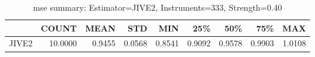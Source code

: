 \begin{table}[ht]
\centering
\caption{mse summary: Estimator=JIVE2, Instruments=333, Strength=0.40}
\begin{tabular}{lrrrrrrrr}
\toprule
 & COUNT & MEAN & STD & MIN & 25\% & 50\% & 75\% & MAX \\
\midrule
JIVE2 & 10.0000 & 0.9455 & 0.0568 & 0.8541 & 0.9092 & 0.9578 & 0.9903 & 1.0108 \\
\bottomrule
\end{tabular}
\end{table}
